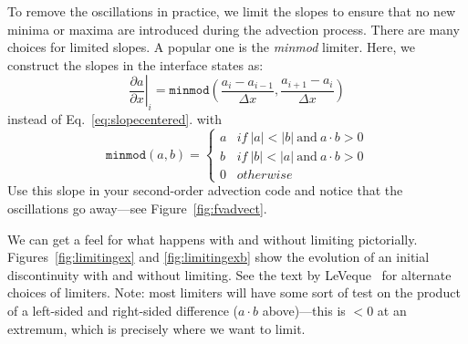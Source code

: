 \begin{exercise}
{To remove the oscillations in
practice, we limit the slopes to ensure that no new minima or maxima are
introduced during the advection process.  There are many choices for
limited slopes.  A popular one is the {\em minmod} limiter.  Here, we
construct the slopes in the interface states as:
\begin{equation}
\left . \frac{\partial a}{\partial x} \right |_i = \mathtt{minmod} \left (
  \frac{a_i - a_{i-1}}{\Delta x}, \frac{a_{i+1} - a_i}{\Delta x} \right )
\end{equation}
instead of Eq.~\ref{eq:slopecentered}.
with 
\begin{equation}
\mathtt{minmod}(a,b) = \left \{ 
    \begin{array}{ll}
    a & \mathit{if~} |a| < |b| \mathrm{~and~} a\cdot b > 0 \\
    b & \mathit{if~} |b| < |a| \mathrm{~and~} a\cdot b > 0 \\
    0 & \mathit{otherwise}
    \end{array}
  \right .
\end{equation}
Use this slope in your second-order advection code and notice that the
oscillations go away---see Figure~\ref{fig:fvadvect}.}
\end{exercise}

We can get a feel for what happens with and without limiting pictorially. 
Figures~\ref{fig:limitingex} and \ref{fig:limitingexb} show the evolution
of an initial discontinuity with and without limiting.  See the text
by LeVeque~\cite{leveque:2002} for alternate choices of
limiters. Note: most limiters will have some sort of test on the product
of a left-sided and right-sided difference ($a\cdot
b$ above)---this is $< 0$ at an extremum, which is precisely where we want to
limit. 

